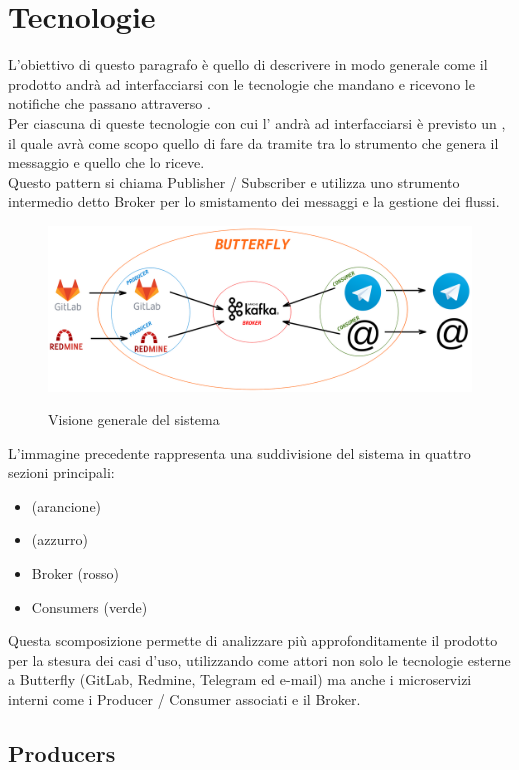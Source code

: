 \section{Tecnologie}
	L'obiettivo di questo paragrafo è quello di descrivere in modo generale come il prodotto andrà ad interfacciarsi con le tecnologie che mandano e ricevono le notifiche che passano attraverso \progetto.\\
	Per ciascuna di queste tecnologie con cui l' andrà ad interfacciarsi è previsto un , il quale avrà come scopo quello di fare da tramite tra lo strumento che genera il messaggio e quello che lo riceve.\\
	Questo pattern si chiama Publisher / Subscriber e utilizza uno strumento intermedio detto Broker per lo smistamento dei messaggi e la gestione dei flussi.

	\begin{figure}[H]
		\centering
		\includegraphics[width=\textwidth]{img/butterfly.png}\\
		\caption{Visione generale del sistema \progetto}
		\label{fig:butterfly}
	\end{figure}
	L'immagine precedente rappresenta una suddivisione del sistema in quattro sezioni principali:
	\begin{itemize}
		\item \progetto (arancione)
		\item {} (azzurro)
		\item Broker (rosso)
		\item Consumers (verde)
	\end{itemize}
	Questa scomposizione permette di analizzare più approfonditamente il prodotto per la stesura dei casi d'uso, utilizzando come attori non solo le tecnologie esterne a Butterfly (GitLab, Redmine, Telegram ed e-mail) ma anche i microservizi interni come i Producer / Consumer associati e il Broker.
	
	\subsection{Producers}
	
